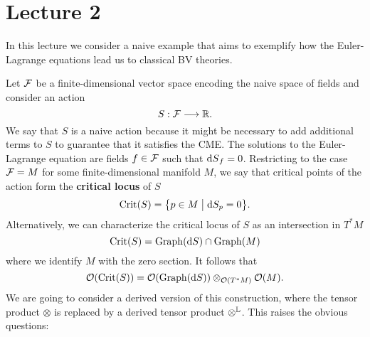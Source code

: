 \chapter{Lecture 2}

In this lecture we consider a naive example that aims to exemplify how the Euler-Lagrange equations lead us to classical BV theories.

\begin{example}
  Let $\mathcal{F}$ be a finite-dimensional vector space encoding the naive space of fields and consider an action
  \begin{equation*}
    S: \mathcal{F} \longrightarrow \mathbb{R}.
  \end{equation*}
  We say that $S$ is a naive action because it might be necessary to add additional terms to $S$ to guarantee that it satisfies the CME. The solutions to the Euler-Lagrange equation are fields $f \in \mathcal{F}$ such that ${\mathrm{d} S}_f = 0$. Restricting to the case $\mathcal{F} = M$ for some finite-dimensional manifold $M$, we say that critical points of the action form the \textbf{critical locus} of $S$
  \begin{equation*}
    \operatorname{Crit} (S) = \bigl\{ p \in M \bigm| \mathrm{d} S_p = 0 \bigr\}.
  \end{equation*}
  Alternatively, we can characterize the critical locus of $S$ as an intersection in $T^* M$
  \begin{equation*}
    \operatorname{Crit} (S) = \operatorname{Graph}( \mathrm{d} S) \cap \operatorname{Graph} (M)
  \end{equation*}
  where we identify $M$ with the zero section. It follows that
  \begin{equation*}
    \mathcal{O}( \operatorname{Crit} (S) ) =
    \mathcal{O}( \operatorname{Graph} (\mathrm{d} S ) ) \otimes_{\mathcal{O}(T^* M)} \mathcal{O}(M).
  \end{equation*}
  We are going to consider a derived version of this construction, where the tensor product $\otimes$ is replaced by a derived tensor product $\otimes^{\mathbb{L}}$. This raises the obvious questions:
  \begin{figure}[ht]
    \centering

\end{figure}
\end{example}
